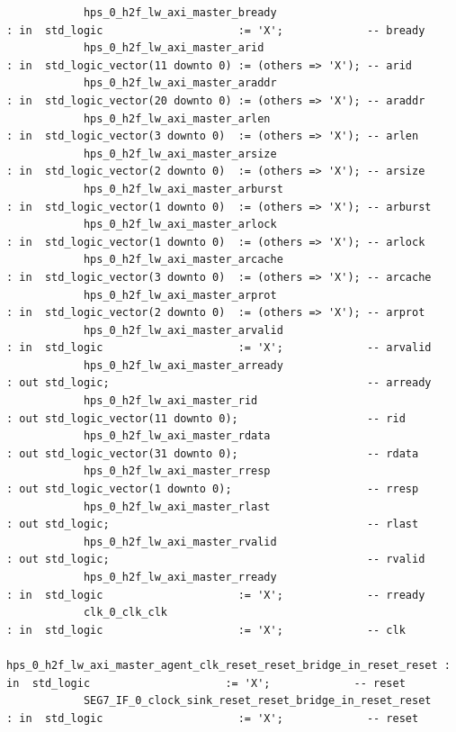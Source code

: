 \documentclass[conference]{IEEEtran}
\begin{document}
\begin{lstlisting}
			hps_0_h2f_lw_axi_master_bready                                      : in  std_logic                     := 'X';             -- bready
			hps_0_h2f_lw_axi_master_arid                                        : in  std_logic_vector(11 downto 0) := (others => 'X'); -- arid
			hps_0_h2f_lw_axi_master_araddr                                      : in  std_logic_vector(20 downto 0) := (others => 'X'); -- araddr
			hps_0_h2f_lw_axi_master_arlen                                       : in  std_logic_vector(3 downto 0)  := (others => 'X'); -- arlen
			hps_0_h2f_lw_axi_master_arsize                                      : in  std_logic_vector(2 downto 0)  := (others => 'X'); -- arsize
			hps_0_h2f_lw_axi_master_arburst                                     : in  std_logic_vector(1 downto 0)  := (others => 'X'); -- arburst
			hps_0_h2f_lw_axi_master_arlock                                      : in  std_logic_vector(1 downto 0)  := (others => 'X'); -- arlock
			hps_0_h2f_lw_axi_master_arcache                                     : in  std_logic_vector(3 downto 0)  := (others => 'X'); -- arcache
			hps_0_h2f_lw_axi_master_arprot                                      : in  std_logic_vector(2 downto 0)  := (others => 'X'); -- arprot
			hps_0_h2f_lw_axi_master_arvalid                                     : in  std_logic                     := 'X';             -- arvalid
			hps_0_h2f_lw_axi_master_arready                                     : out std_logic;                                        -- arready
			hps_0_h2f_lw_axi_master_rid                                         : out std_logic_vector(11 downto 0);                    -- rid
			hps_0_h2f_lw_axi_master_rdata                                       : out std_logic_vector(31 downto 0);                    -- rdata
			hps_0_h2f_lw_axi_master_rresp                                       : out std_logic_vector(1 downto 0);                     -- rresp
			hps_0_h2f_lw_axi_master_rlast                                       : out std_logic;                                        -- rlast
			hps_0_h2f_lw_axi_master_rvalid                                      : out std_logic;                                        -- rvalid
			hps_0_h2f_lw_axi_master_rready                                      : in  std_logic                     := 'X';             -- rready
			clk_0_clk_clk                                                       : in  std_logic                     := 'X';             -- clk
			hps_0_h2f_lw_axi_master_agent_clk_reset_reset_bridge_in_reset_reset : in  std_logic                     := 'X';             -- reset
			SEG7_IF_0_clock_sink_reset_reset_bridge_in_reset_reset              : in  std_logic                     := 'X';             -- reset

\end{lstlisting}
\end{document}
